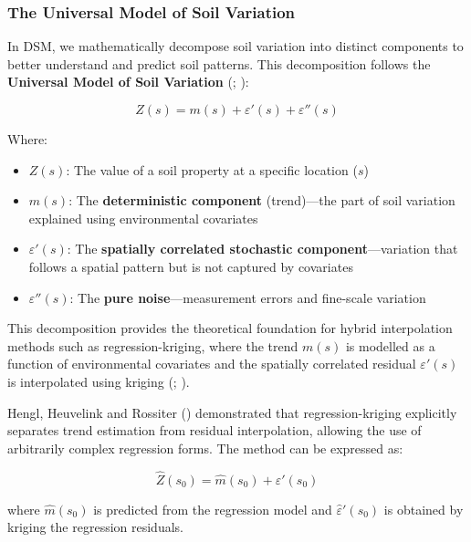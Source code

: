 \documentclass[
  10pt,
  b5paper,
  oneside]{book}
\providecommand{\tightlist}{%
  \setlength{\itemsep}{0pt}\setlength{\parskip}{0pt}}
\begin{document}
\subsubsection{The Universal Model of Soil Variation}\label{the-universal-model-of-soil-variation}

In DSM, we mathematically decompose soil variation into distinct components to better understand and predict soil patterns. This decomposition follows the \textbf{Universal Model of Soil Variation} (; ):

\[Z(s) = m(s) + \varepsilon'(s) + \varepsilon''(s)\]

Where:

\begin{itemize}
\tightlist
\item
  \(Z(s)\): The value of a soil property at a specific location (\(s\))
\item
  \(m(s)\): The \textbf{deterministic component} (trend)---the part of soil variation explained using environmental covariates
\item
  \(\varepsilon'(s)\): The \textbf{spatially correlated stochastic component}---variation that follows a spatial pattern but is not captured by covariates
\item
  \(\varepsilon''(s)\): The \textbf{pure noise}---measurement errors and fine-scale variation
\end{itemize}

This decomposition provides the theoretical foundation for hybrid interpolation methods such as regression-kriging, where the trend \(m(s)\) is modelled as a function of environmental covariates and the spatially correlated residual \(\varepsilon'(s)\) is interpolated using kriging (; ).

Hengl, Heuvelink and Rossiter () demonstrated that regression-kriging explicitly separates trend estimation from residual interpolation, allowing the use of arbitrarily complex regression forms. The method can be expressed as:

\[\hat{Z}(s_0) = \hat{m}(s_0) + \hat{\varepsilon}'(s_0)\]

where \(\hat{m}(s_0)\) is predicted from the regression model and \(\hat{\varepsilon}'(s_0)\) is obtained by kriging the regression residuals.
\end{document}
